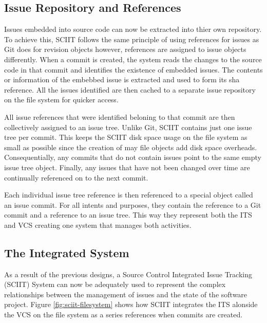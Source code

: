 \documentclass{mproj}
\begin{document}
\subsection{Issue Repository and References}

Issues embedded into source code can now be extracted into thier own repository. To achieve this, SCIIT follows the same principle of using references for issues as Git does for revision objects however, references are assigned to issue objects differently. When a commit is created, the system reads the changes to the source code in that commit and identifies the existence of embedded issues. The contents or information of the embebbed issue is extracted and used to form its sha reference. All the issues identified are then cached to a separate issue repository on the file system for quicker access. 

All issue references that were identified beloning to that commit are then collectively assigned to an issue tree. Unlike Git, SCIIT contains just one issue tree per commit. This keeps the SCIIT disk space usage on the file system as small as possible since the creation of may file objects add disk space overheads. Consequentially, any commits that do not contain issues point to the same empty issue tree object. Finally, any issues that have not been changed over time are continually referenced on to the next commit.

Each individual issue tree reference is then referenced to a special object called an issue commit. For all intents and purposes, they contain the reference to a Git commit and a reference to an issue tree. This way they represent both the ITS and VCS creating one system that manages both activities. 




\subsection{The Integrated System}

As a result of the previous designs, a Source Control Integrated Issue Tracking (SCIIT) System can now be adequately used to represent the complex relationships between the management of issues and the state of the software project. Figure \ref{fig:sciit-filesystem} shows how SCIIT integrates the ITS alonside the VCS on the file system as a series references when commits are created.
\end{document}
